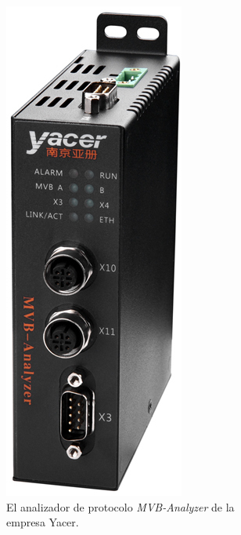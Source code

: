\begin{figure}[htbp]
	\centering
    \begin{subfigure}[b]{0.45\textwidth}
        \centering
        \includegraphics[height=17\baselineskip]{./Figures/yacer.jpg}
        \caption[Yacer -- MVB-Analyzer]{El analizador de protocolo \textit{MVB-Analyzer} de la empresa Yacer.}
        \label{fig:yacer}
    \end{subfigure}
    \hfill
    \begin{subfigure}[b]{0.45\textwidth}
        \centering

\end{subfigure}
\end{figure}
